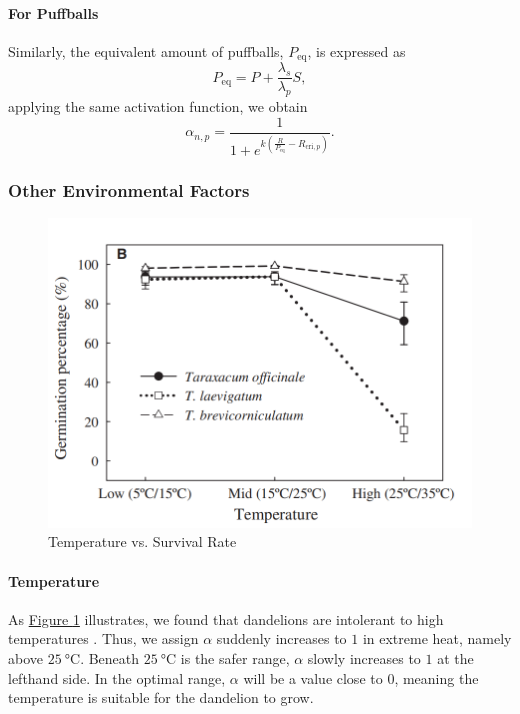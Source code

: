 \documentclass[12pt]{article}
\begin{document}
\paragraph{For Puffballs}
Similarly, the equivalent amount of puffballs, $P_{\text{eq}}$, is expressed as
\begin{equation}
    P_{\text{eq}}=P+\frac{\lambda_s}{\lambda_p}S,
\end{equation}
applying the same activation function, we obtain
\begin{equation}
    \alpha_{n,p}=\frac{1}{1+e^{k\left(\frac{R}{P_{\text{eq}}}-R_{\text{cri},p}\right)}}.
\end{equation}

\subsubsection{Other Environmental Factors}
\begin{figure}
	\centering
	\includegraphics[width=0.7\linewidth]{img/Temp.png}
	\caption{Temperature vs. Survival Rate}
	\label{temp}
\end{figure}
\paragraph{Temperature}
As \hyperref[temp]{Figure \ref*{temp}} illustrates, we found that dandelions are intolerant to high temperatures \cite{luo_germination_2012}. Thus, we assign $\alpha$ suddenly increases to $1$ in extreme heat, namely above $\SI{25}{\degreeCelsius}$. Beneath $\SI{25}{\degreeCelsius}$ is the safer range, $\alpha$ slowly increases to $1$ at the lefthand side. In the optimal range, $\alpha$ will be a value close to $0$, meaning the temperature is suitable for the dandelion to grow.
\end{document}
